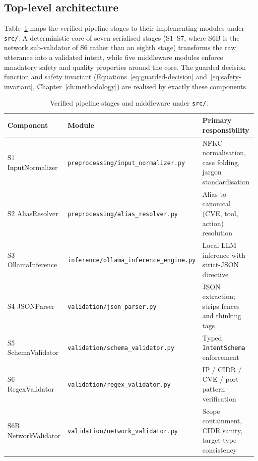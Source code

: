 \subsection*{Top-level architecture}

Table~\ref{tab:stage-modules} maps the verified pipeline stages to their
implementing modules under \texttt{src/}. A deterministic core of seven
serialised stages (S1--S7, where S6B is the network sub-validator of S6 rather
than an eighth stage) transforms the raw utterance into a validated intent,
while five middleware modules enforce mandatory safety and quality properties
around the core. The guarded decision function and safety invariant
(Equations~\ref{eq:guarded-decision} and~\ref{eq:safety-invariant},
Chapter~\ref{ch:methodology}) are realised by exactly these components.

\begin{table}[h]
\centering
\small
\caption{Verified pipeline stages and middleware under \texttt{src/}.}\label{tab:stage-modules}
\begin{tabular}{@{}p{2.9cm}>{\raggedright\arraybackslash}p{4.7cm}>{\raggedright\arraybackslash}p{5.8cm}@{}}
\toprule
\textbf{Component} & \textbf{Module} & \textbf{Primary responsibility}\\
\midrule
S1 InputNormalizer & \texttt{preprocessing/}\allowbreak\texttt{input\_}\allowbreak\texttt{normalizer.py} & NFKC normalisation, case folding, jargon standardisation\\
S2 AliasResolver & \texttt{preprocessing/}\allowbreak\texttt{alias\_}\allowbreak\texttt{resolver.py} & Alias-to-canonical (CVE, tool, action) resolution\\
S3 OllamaInference & \texttt{inference/}\allowbreak\texttt{ollama\_}\allowbreak\texttt{inference\_}\allowbreak\texttt{engine.py} & Local LLM inference with strict-JSON directive\\
S4 JSONParser & \texttt{validation/}\allowbreak\texttt{json\_}\allowbreak\texttt{parser.py} & JSON extraction; strips fences and thinking tags\\
S5 SchemaValidator & \texttt{validation/}\allowbreak\texttt{schema\_}\allowbreak\texttt{validator.py} & Typed \texttt{IntentSchema} enforcement\\
S6 RegexValidator & \texttt{validation/}\allowbreak\texttt{regex\_}\allowbreak\texttt{validator.py} & IP / CIDR / CVE / port pattern verification\\
S6B NetworkValidator & \texttt{validation/}\allowbreak\texttt{network\_}\allowbreak\texttt{validator.py} & Scope containment, CIDR sanity, target-type consistency\\

\end{tabular}
\end{table}
